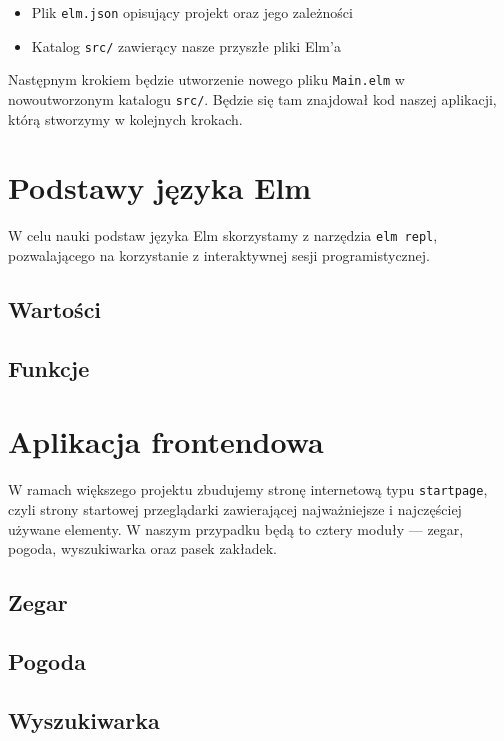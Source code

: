 \documentclass[twoside,a4paper]{report}
\begin{document}
\begin{itemize}[noitemsep,topsep=0pt]
    \item{Plik \texttt{elm.json} opisujący projekt oraz jego zależności}
    \item{Katalog \texttt{src/} zawierący nasze przyszłe pliki Elm'a}
\end{itemize}

Następnym krokiem będzie utworzenie nowego pliku \texttt{Main.elm} w nowoutworzonym katalogu \texttt{src/}.
Będzie się tam znajdował kod naszej aplikacji, którą stworzymy w kolejnych krokach.

\section{Podstawy języka Elm}
W celu nauki podstaw języka Elm skorzystamy z narzędzia \texttt{elm repl}, pozwalającego na korzystanie z interaktywnej sesji programistycznej.

\subsection{Wartości}

\subsection{Funkcje}

\section{Aplikacja frontendowa}
W ramach większego projektu zbudujemy stronę internetową typu \texttt{startpage}, czyli strony startowej przeglądarki zawierającej najważniejsze i najczęściej używane elementy.
W naszym przypadku będą to cztery moduły --- zegar, pogoda, wyszukiwarka oraz pasek zakładek.

\subsection{Zegar}

\subsection{Pogoda}

\subsection{Wyszukiwarka}
\end{document}
